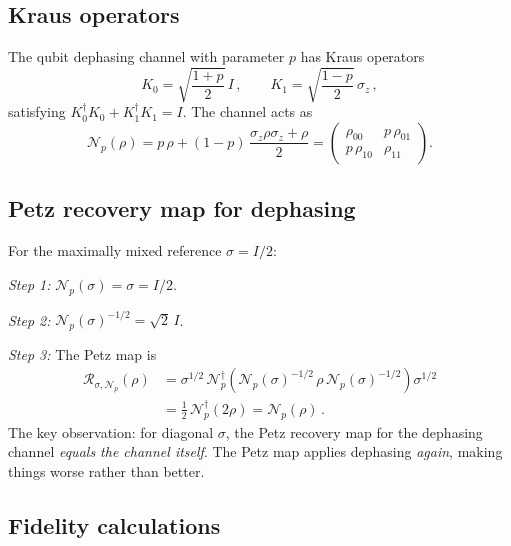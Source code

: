 \documentclass[aps,prd,preprint,superscriptaddress,longbibliography]{revtex4-2}
\newcommand{\Petz}{\mathcal{R}}
\newcommand{\chan}{\mathcal{N}}
\begin{document}
\subsection{Kraus operators}

The qubit dephasing channel with parameter $p$ has Kraus operators
\begin{equation}
  K_0 = \sqrt{\frac{1+p}{2}}\,I\,,\qquad
  K_1 = \sqrt{\frac{1-p}{2}}\,\sigma_z\,,
  \label{eq:dephasing_Kraus}
\end{equation}
satisfying $K_0^\dagger K_0 + K_1^\dagger K_1 = I$.  The channel
acts as
\begin{equation}
  \chan_p(\rho) = p\,\rho + (1-p)\,\frac{\sigma_z\rho\sigma_z + \rho}{2}
  = \begin{pmatrix} \rho_{00} & p\,\rho_{01} \\ p\,\rho_{10} & \rho_{11}
  \end{pmatrix}.
  \label{eq:dephasing_action}
\end{equation}

\subsection{Petz recovery map for dephasing}

For the maximally mixed reference $\sigma = I/2$:

\emph{Step 1:} $\chan_p(\sigma) = \sigma = I/2$.

\emph{Step 2:} $\chan_p(\sigma)^{-1/2} = \sqrt{2}\,I$.

\emph{Step 3:} The Petz map is
\begin{align}
  \Petz_{\sigma,\chan_p}(\rho) &= \sigma^{1/2}\,\chan_p^\dagger
  \!\left(\chan_p(\sigma)^{-1/2}\,\rho\,\chan_p(\sigma)^{-1/2}\right)
  \sigma^{1/2}
  \nonumber\\
  &= \frac{1}{2}\,\chan_p^\dagger(2\rho)
  = \chan_p(\rho)\,.
  \label{eq:Petz_dephasing}
\end{align}
The key observation: for diagonal $\sigma$, the Petz recovery map
for the dephasing channel \emph{equals the channel itself}.  The
Petz map applies dephasing \emph{again}, making things worse rather
than better.

\subsection{Fidelity calculations}
\end{document}
